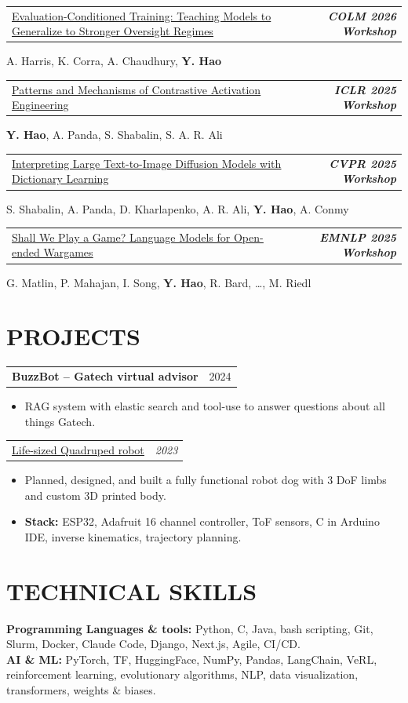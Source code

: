 \documentclass[11pt,letterpaper]{article}
\makeatletter
\newcommand{\ulink}[2]{\href{#1}{\underline{#2}}}
\newcommand{\entry}[2]{%
  \noindent\begin{tabular*}{\textwidth}{@{}l@{\extracolsep{\fill}}r@{}}%
    #1 & #2%
  \end{tabular*}\par\vspace{0.5pt}}
\newcommand{\pub}[4]{%
  \entry{\ulink{#2}{#1}}{\textit{\textbf{#3}}}%
  #4\par\vspace{3pt}}
\newenvironment{items}
  {\begin{itemize}[leftmargin=1.4em,topsep=0pt,partopsep=0pt,parsep=0pt,itemsep=0pt,label=\textbullet]}
  {\end{itemize}\vspace{1.5pt}}
\makeatother
\begin{document}
\pub{Evaluation-Conditioned Training: Teaching Models to Generalize to Stronger Oversight Regimes}{https://arxiv.org/abs/2608.10209}{COLM 2026 Workshop}
  {A. Harris, K. Corra, A. Chaudhury, \textbf{Y. Hao}}

\pub{Patterns and Mechanisms of Contrastive Activation Engineering}{https://arxiv.org/abs/2505.03189}{ICLR 2025 Workshop}
  {\textbf{Y. Hao}, A. Panda, S. Shabalin, S. A. R. Ali}

\pub{Interpreting Large Text-to-Image Diffusion Models with Dictionary Learning}{https://arxiv.org/abs/2505.24360}{CVPR 2025 Workshop}
  {S. Shabalin, A. Panda, D. Kharlapenko, A. R. Ali, \textbf{Y. Hao}, A. Conmy}

\pub{Shall We Play a Game? Language Models for Open-ended Wargames}{https://arxiv.org/abs/2509.17192}{EMNLP 2025 Workshop}
  {G. Matlin, P. Mahajan, I. Song, \textbf{Y. Hao}, R. Bard, \ldots, M. Riedl}

\section*{PROJECTS}

\entry{\textbf{BuzzBot -- Gatech virtual advisor}}{2024}
\begin{items}
  \item RAG system with elastic search and tool-use to answer questions about all things Gatech.
\end{items}

\entry{\ulink{https://github.com/YixiongHao/spot}{Life-sized Quadruped robot}}{\textit{2023}}
\begin{items}
  \item Planned, designed, and built a fully functional robot dog with 3 DoF limbs and custom 3D printed body.
  \item \textbf{Stack:} ESP32, Adafruit 16 channel controller, ToF sensors, C in Arduino IDE, inverse kinematics, trajectory planning.
\end{items}

\section*{TECHNICAL SKILLS}
\textbf{Programming Languages \& tools:} Python, C, Java, bash scripting, Git, Slurm, Docker, Claude Code, Django, Next.js, Agile, CI/CD.\\
\textbf{AI \& ML:} PyTorch, TF, HuggingFace, NumPy, Pandas, LangChain, VeRL, reinforcement learning, evolutionary algorithms, NLP, data visualization, transformers, weights \& biases.
\end{document}

